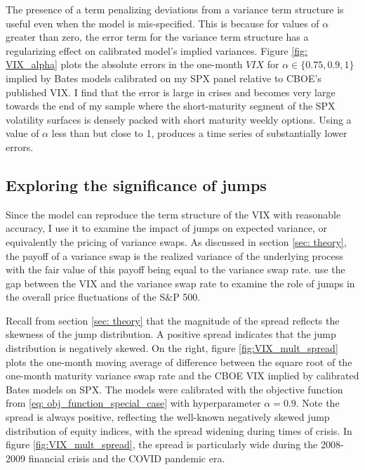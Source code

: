 \documentclass[12pt]{article}
\begin{document}
The presence of a term penalizing deviations from a variance term structure is useful even when the model is mis-specified. This is because for values of $\alpha$ greater than zero, the error term for the variance term structure has a regularizing effect on calibrated model's implied variances. Figure \ref{fig: VIX_alpha} plots the absolute errors in the one-month $VIX$ for $\alpha \in \lbrace 0.75, 0.9, 1\rbrace$ implied by Bates models calibrated on my SPX panel relative to CBOE's published VIX. I find that the error is large in crises and becomes very large towards the end of my sample where the short-maturity segment of the SPX volatility surfaces is densely packed with short maturity weekly options. Using a value of $\alpha$ less than but close to 1, produces a time series of substantially lower errors.

 
\subsection{Exploring the significance of jumps}\label{subsec: SPX_jump_process}
Since the model can reproduce the term structure of the VIX with reasonable accuracy, I use it to examine the impact of jumps on expected variance, or equivalently the pricing of variance swaps. As discussed in section \ref{sec: theory}, the payoff of a variance swap is the realized variance of the underlying process with the fair value of this payoff being equal to the variance swap rate. \cite{ait2020term} use the gap between the VIX and the variance swap rate to examine the role of jumps in the overall price fluctuations of the S\&P 500. 

Recall from section \ref{sec: theory} that the magnitude of the spread reflects the skewness of the jump distribution. A positive spread indicates that the jump distribution is negatively skewed. On the right, figure \ref{fig:VIX_mult_spread} plots the one-month moving average of difference between the square root of the one-month maturity variance swap rate and the CBOE VIX implied by calibrated Bates models on SPX. The models were calibrated with the objective function from \eqref{eq: obj_function_special_case} with hyperparameter $\alpha = 0.9$. Note the spread is always positive, reflecting the well-known negatively skewed jump distribution of equity indices, with the spread widening during times of crisis. In figure \ref{fig:VIX_mult_spread}, the spread is particularly wide during the 2008-2009 financial crisis and the COVID pandemic era. 
\end{document}
